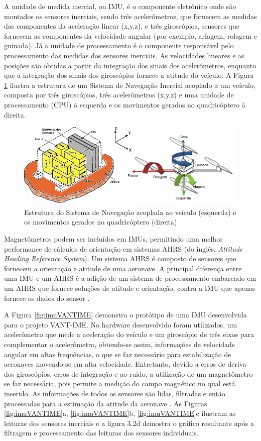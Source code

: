 \documentclass[a4paper, 12pt]{article}
\begin{document}
A unidade de medida inercial, ou IMU, é o componente eletrônico onde são montados os sensores inerciais, sendo três acelerômetros, que fornecem as medidas das componentes da aceleração linear (x,y,z), e três giroscópios, sensores que fornecem as componentes da velocidade angular (por exemplo, arfagem, rolagem e guinada). Já a unidade de processamento é o componente responsável pelo processamento das medidas dos sensores inerciais. As velocidades lineares e as posições são obtidas a partir da integração dos sinais dos acelerômetros, enquanto que a integração dos sinais dos giroscópios fornece a atitude do veículo.  A Figura \ref{fig:imuStrap} ilustra a estrutura de um Sistema de Navegação Inercial acoplado a um veículo, composta por três giroscópios, três acelerômetros (x,y,z) e uma unidade de processamento (CPU) à esquerda e os movimentos gerados no quadricóptero à direita.

\begin{figure}[h]
	\centering
		\includegraphics[scale=0.6]{img/imuStrap.png}
	\caption{Estrutura do Sistema de Navegação acoplada ao veículo (esquerda) e os movimentos gerados no quadricóptero (direita) }
	\label{fig:imuStrap}
\end{figure}

Magnetômetros podem ser incluídos em IMUs, permitindo uma melhor performance de cálculos de orientação em sistemas AHRS (do inglês, \textit{Attitude Heading Reference System}). Um sistema AHRS é composto de sensores que fornecem a orientação e atitude de uma aeronave. A principal diferença entre uma IMU e um AHRS é a adição de um sistema de processamento embarcado em um AHRS que fornece soluções de atitude e orientação, contra a IMU que apenas fornece os dados do sensor \cite{Angonese2013}.

A Figura \ref{fig:imuVANTIME} demonstra o protótipo de uma IMU desenvolvida para o projeto VANT-IME. No hardware desenvolvido foram utilizados, um acelerômetro que mede a aceleração do veículo e um giroscópio de três eixos para complementar o acelerômetro, obtendo-se assim, informações de velocidade angular em altas frequências, o que se faz necessário para estabilização de aeronaves movendo-se em alta velocidade. Entretanto, devido a erros de deriva dos giroscópios, erros de integração e ao ruído, a utilização de um magnetômetro se faz necessária, pois permite a medição do campo magnético no qual está inserido. As informações de todos os sensores são lidas, filtradas e então processadas para a estimação da atitude da aeronave \cite{Paixao2011}. As Figuras \ref{fig:imuVANTIME}a,  \ref{fig:imuVANTIME}b,  \ref{fig:imuVANTIME}c ilustram as leituras dos sensores inerciais e a figura 3.2d demostra o gráfico resultante após a filtragem e processamento das leituras dos sensores individuais.
\end{document}
